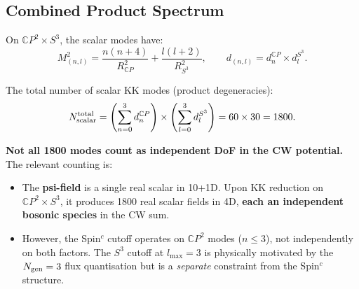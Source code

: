 \documentclass[11pt,a4paper]{article}
\newcommand{\CP}{\mathbb{C}P}
\newcommand{\Ngen}{N_{\rm gen}}
\begin{document}
\subsection{Combined Product Spectrum}

On $\CP^2 \times S^3$, the scalar modes have:
\begin{equation}
M^2_{(n,l)} = \frac{n(n+4)}{R_{\CP}^2} + \frac{l(l+2)}{R_{S^3}^2},
\qquad d_{(n,l)} = d_n^{\CP} \times d_l^{S^3}.
\end{equation}

The total number of scalar KK modes (product degeneracies):
\begin{equation}
N_{\rm scalar}^{\rm total} = \left(\sum_{n=0}^3 d_n^{\CP}\right)
\times \left(\sum_{l=0}^3 d_l^{S^3}\right) = 60 \times 30 = 1800.
\end{equation}

\textbf{Not all 1800 modes count as independent DoF in the CW
potential.} The relevant counting is:

\begin{itemize}
\item The \textbf{psi-field} is a single real scalar in 10+1D.
  Upon KK reduction on $\CP^2 \times S^3$, it produces 1800
  real scalar fields in 4D, \textbf{each an independent bosonic
  species} in the CW sum.

\item However, the Spin$^c$ cutoff operates on $\CP^2$ modes
  ($n \leq 3$), not independently on both factors. The $S^3$
  cutoff at $l_{\max} = 3$ is physically motivated by the
  $\Ngen = 3$ flux quantisation but is a \emph{separate}
  constraint from the Spin$^c$ structure.
\end{itemize}
\end{document}
